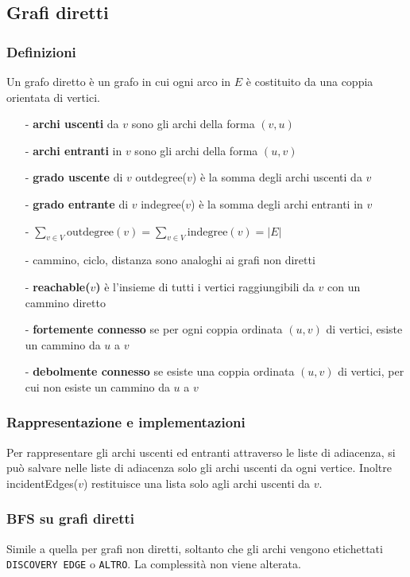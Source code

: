 \documentclass[a4paper]{article}
\begin{document}
\newpage

\subsection{Grafi diretti}
\subsubsection*{Definizioni}
Un grafo diretto è un grafo in cui ogni arco in \(E\) è costituito da una coppia orientata di vertici.
\begin{itemize}[topsep=3pt, itemsep=0pt]
	\item[-] \textbf{archi uscenti} da \(v\) sono gli archi della forma \((v,u)\)
	\item[-] \textbf{archi entranti} in \(v\) sono gli archi della forma \((u,v)\)
	\item[-] \textbf{grado uscente} di \(v\) outdegree(\(v\)) è la somma degli archi uscenti da \(v\)
	\item[-] \textbf{grado entrante} di \(v\) indegree(\(v\)) è la somma degli archi entranti in \(v\)
	\item[-] \(\displaystyle \sum_{v \in V} \text{outdegree}(v) = \sum_{v \in V} \text{indegree}(v) = |E|\)
	\item[-] cammino, ciclo, distanza sono analoghi ai grafi non diretti
	\item[-] \textbf{reachable(\(v\))} è l'insieme di tutti i vertici raggiungibili da \(v\) con un cammino diretto
	\item[-] \textbf{fortemente connesso} se per ogni coppia ordinata \((u,v)\) di vertici, esiste un cammino da \(u\) a \(v\)
	\item[-] \textbf{debolmente connesso} se esiste una coppia ordinata \((u,v)\) di vertici, per cui non esiste un cammino da \(u\) a \(v\)
\end{itemize}

\subsubsection*{Rappresentazione e implementazioni}
Per rappresentare gli archi uscenti ed entranti attraverso le liste di adiacenza, si può salvare nelle liste di adiacenza solo
gli archi uscenti da ogni vertice. Inoltre incidentEdges(\(v\)) restituisce una lista solo agli archi uscenti da \(v\).

\subsubsection*{BFS su grafi diretti}
Simile a quella per grafi non diretti, soltanto che gli archi vengono etichettati \verb|DISCOVERY EDGE| o \verb|ALTRO|. La
complessità non viene alterata.
\end{document}
